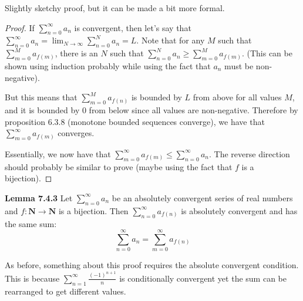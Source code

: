 \documentclass[answers,12pt]{exam}
\begin{document}
\begin{solution}
    Slightly sketchy proof, but it can be made a bit more formal.
\begin{proof}
    If $\sum_{n=0}^{\infty} a_n$ is convergent, then let's say that $\sum_{n=0}^{\infty} a_n = \lim_{N \to \infty} \sum_{n=0}^{N} a_n = L$.
    Note that for any $M$ such that $\sum_{m=0}^{M} a_{f(m)}$, there is an $N$ such that $\sum_{n=0}^{N}a_n \geq \sum_{m=0}^{M} a_{f(m)}$.
    (This can be shown using induction probably while using the fact that $a_n$ must be non-negative).

    But this means that $\sum_{m=0}^{M} a_{f(n)}$ is bounded by $L$ from above for all values $M$, and it is bounded by 0 from below since all values are non-negative.
    Therefore by proposition 6.3.8 (monotone bounded sequences converge), we have that $\sum_{m=0}^{\infty}a_{f(m)}$ converges.

    Essentially, we now have that $\sum_{m=0}^{\infty} a_{f(m)} \leq \sum_{n=0}^{\infty} a_n$.
    The reverse direction should probably be similar to prove (maybe using the fact that $f$ is a bijection).
\end{proof}
\end{solution}

\textbf{Lemma 7.4.3}
Let $\sum_{n=0}^{\infty} a_n$ be an absolutely convergent series of real numbers and $f: \mathbf{N} \to \mathbf{N}$ is a bijection.
Then $\sum_{n=0}^{\infty} a_{f(n)}$ is absolutely convergent and has the same sum:
\[
    \sum_{n=0}^{\infty} a_n = \sum_{m=0}^{\infty} a_{f(n)}
\]

As before, something about this proof requires the absolute convergent condition.
This is because $\sum_{n=1}^{\infty} \frac{{(-1)}^{n+1}}{n}$ is conditionally convergent yet the sum can be rearranged to get different values.
\end{document}
